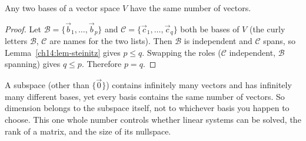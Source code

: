 \begin{theorem}
\label{ch14:thm-dim}
Any two bases of a vector space $V$ have the same number of vectors.
\end{theorem}

\begin{proof}
Let $\mathcal B = \{\vec{b}_1,\dots,\vec{b}_p\}$ and $\mathcal C =
\{\vec{c}_1,\dots,\vec{c}_q\}$ both be bases of $V$ (the curly letters $\mathcal B$,
$\mathcal C$ are names for the two lists). Then $\mathcal B$ is
independent and $\mathcal C$ spans, so Lemma~\ref{ch14:lem-steinitz} gives $p \le
q$. Swapping the roles ($\mathcal C$ independent, $\mathcal B$ spanning) gives $q \le p$.
Therefore $p = q$.
\end{proof}

\begin{aestheticbox}
A subspace (other than $\{\vec{0}\}$) contains infinitely many vectors and has infinitely
many different bases, yet every basis contains the same number of vectors.
So dimension belongs to the subspace itself, not to whichever basis you
happen to choose. This one whole number controls whether linear systems can be solved,
the rank of a matrix, and the size of its nullspace.
\end{aestheticbox}

